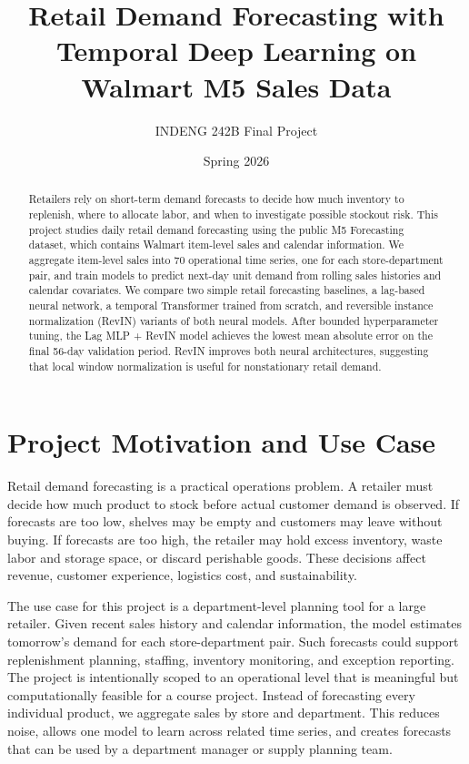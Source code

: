 \documentclass[11pt]{article}
\title{Retail Demand Forecasting with Temporal Deep Learning on Walmart M5 Sales Data}
\author{INDENG 242B Final Project}
\date{Spring 2026}
\begin{document}
\maketitle

\begin{abstract}
Retailers rely on short-term demand forecasts to decide how much inventory to replenish, where to allocate labor, and when to investigate possible stockout risk. This project studies daily retail demand forecasting using the public M5 Forecasting dataset, which contains Walmart item-level sales and calendar information. We aggregate item-level sales into 70 operational time series, one for each store-department pair, and train models to predict next-day unit demand from rolling sales histories and calendar covariates. We compare two simple retail forecasting baselines, a lag-based neural network, a temporal Transformer trained from scratch, and reversible instance normalization (RevIN) variants of both neural models. After bounded hyperparameter tuning, the Lag MLP + RevIN model achieves the lowest mean absolute error on the final 56-day validation period. RevIN improves both neural architectures, suggesting that local window normalization is useful for nonstationary retail demand.
\end{abstract}

\section{Project Motivation and Use Case}

Retail demand forecasting is a practical operations problem. A retailer must decide how much product to stock before actual customer demand is observed. If forecasts are too low, shelves may be empty and customers may leave without buying. If forecasts are too high, the retailer may hold excess inventory, waste labor and storage space, or discard perishable goods. These decisions affect revenue, customer experience, logistics cost, and sustainability.

The use case for this project is a department-level planning tool for a large retailer. Given recent sales history and calendar information, the model estimates tomorrow's demand for each store-department pair. Such forecasts could support replenishment planning, staffing, inventory monitoring, and exception reporting. The project is intentionally scoped to an operational level that is meaningful but computationally feasible for a course project. Instead of forecasting every individual product, we aggregate sales by store and department. This reduces noise, allows one model to learn across related time series, and creates forecasts that can be used by a department manager or supply planning team.
\end{document}
